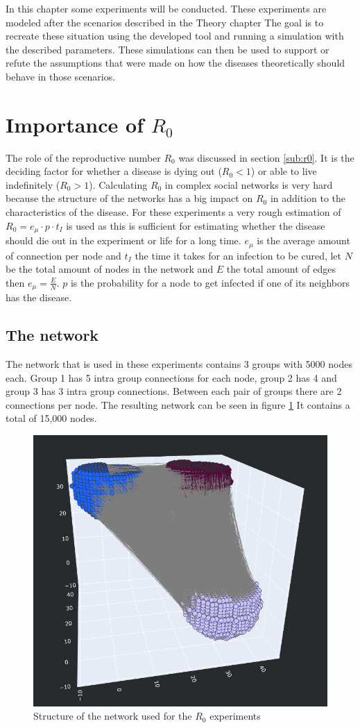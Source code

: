 In this chapter some experiments will be conducted. These experiments are modeled
after the scenarios described in the Theory chapter %
The goal is to recreate these situation using the developed tool and running a
simulation with the described parameters. These simulations can then be used
to support or refute the assumptions that were made on how the diseases
theoretically should behave in those scenarios.

\section{Importance of $R_0$}
The role of the reproductive number $R_0$ was discussed in section \ref{sub:r0}.
It is the deciding factor for whether a disease is dying out ($R_0 < 1$) 
or able to live indefinitely ($R_0 > 1$). Calculating $R_0$ in complex social
networks is very hard because the structure of the networks has a big impact on $R_0$
in addition to the characteristics of the disease. For these experiments a very
rough estimation of $R_0=e_\mu \cdot p \cdot t_I$ is used as this is sufficient for estimating whether
the disease should die out in the experiment or life for a long time.
$e_\mu$ is the average amount of connection per node and $t_I$ the time it takes
for an infection to be cured, let $N$ be the total
amount of nodes in the network and $E$ the total amount of edges then
$e_\mu=\frac{E}{N}$. $p$ is the probability for a node to get infected
if one of its neighbors has the disease.

\subsection{The network}
\label{sub:exp_network}
The network that is used in these experiments contains 3 groups with 5000 nodes
each. Group 1 has 5 intra group connections for each node, group 2 has 4 and
group 3 has 3 intra group connections. Between each pair of groups there are
2 connections per node. The resulting network can be seen in figure \ref{fig:exp_r0_network}
It contains a total of 15,000 nodes.

\begin{figure}
    \centering
    \includegraphics[width=0.5\linewidth]{images/experiment_r0_network.png}
    \caption{Structure of the network used for the $R_0$ experiments}
    \label{fig:exp_r0_network}
\end{figure}

